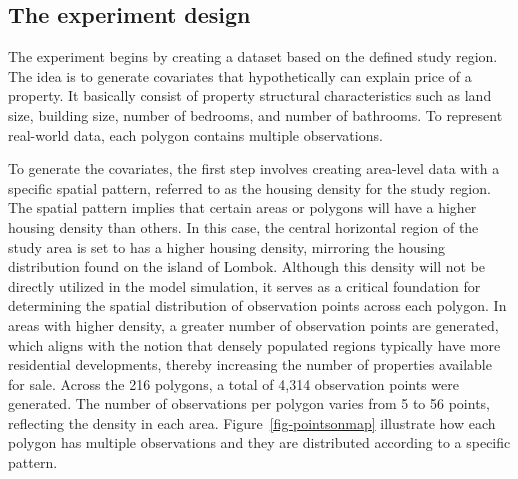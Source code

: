 \documentclass[
  default,
]{sn-jnl}
\begin{document}
\subsection{The experiment design}\label{the-experiment-design}

The experiment begins by creating a dataset based on the defined study
region. The idea is to generate covariates that hypothetically can
explain price of a property. It basically consist of property structural
characteristics such as land size, building size, number of bedrooms,
and number of bathrooms. To represent real-world data, each polygon
contains multiple observations.

To generate the covariates, the first step involves creating area-level
data with a specific spatial pattern, referred to as the housing density
for the study region. The spatial pattern implies that certain areas or
polygons will have a higher housing density than others. In this case,
the central horizontal region of the study area is set to has a higher
housing density, mirroring the housing distribution found on the island
of Lombok. Although this density will not be directly utilized in the
model simulation, it serves as a critical foundation for determining the
spatial distribution of observation points across each polygon. In areas
with higher density, a greater number of observation points are
generated, which aligns with the notion that densely populated regions
typically have more residential developments, thereby increasing the
number of properties available for sale. Across the 216 polygons, a
total of 4,314 observation points were generated. The number of
observations per polygon varies from 5 to 56 points, reflecting the
density in each area. Figure~\ref{fig-pointsonmap} illustrate how each
polygon has multiple observations and they are distributed according to
a specific pattern.
\end{document}
